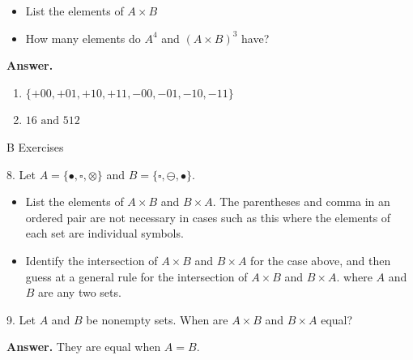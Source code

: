 \documentclass[10pt,]{book}
\theoremstyle{plain}
\theoremstyle{definition}
\theoremstyle{definition}
\theoremstyle{definition}
\theoremstyle{definition}
\begin{document}
\begin{exercisegroup}
\begin{itemize}[label=\textbullet]
\item{}  List the elements of \(A \times  B\) %
\item{}  How many elements do \(A ^4\) and \((A \times B)^3\) have? %
\end{itemize}
%
\par\smallskip
\par\smallskip
\noindent\textbf{Answer.}\hypertarget{answer-11}{}\quad
\leavevmode%
\begin{enumerate}[label=\alph*]
\item\hypertarget{li-159}{} \(\{+00, +01, +10, +11, -00, -01, -10, -11\}\)%
\item\hypertarget{li-160}{} \(16 \textrm{ and } 512\)%
\end{enumerate}
%
\end{exercisegroup}
\par\smallskip\noindent
\hypertarget{exercisegroup-6}{}\typeout{************************************************}
\typeout{************************************************}
B Exercises%
\begin{exercisegroup}
\item[8.]\hypertarget{exercise-22}{}Let \(A = \{\bullet,\square ,\otimes \}\) and \(B = \{\square ,\ominus ,\bullet\}\). %
\par
\leavevmode%
\begin{itemize}[label=\textbullet]
\item{} List the elements of \(A \times  B\) and \(B \times  A\). The parentheses and comma in an ordered pair are not necessary in cases such as this where the elements of each set are individual symbols. %
\item{}  Identify the intersection of \(A \times  B\) and \(B \times  A\) for the case above, and then guess at a general rule for the intersection of \(A \times  B\) and \(B \times  A\). where \( A\) and \( B\) are any two sets. %
\end{itemize}
%
\par\smallskip
\item[9.]\hypertarget{exercise-23}{}Let \(A\) and \(B\) be nonempty sets. When are \(A \times  B\) and \(B \times  A\) equal? %
\par\smallskip
\par\smallskip
\noindent\textbf{Answer.}\hypertarget{answer-12}{}\quad
 They are equal when \(A=B\).%
\end{exercisegroup}
\par\smallskip\noindent
\typeout{************************************************}
\typeout{************************************************}
\end{document}
